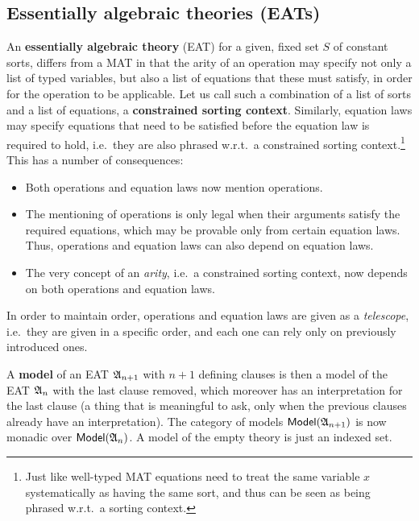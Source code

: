 \documentclass[a4paper]{article}
\begin{document}
\subsection{Essentially algebraic theories (EATs)}
An \textbf{essentially algebraic theory} (EAT) for a given, fixed set $S$ of constant sorts, differs from a MAT in that the arity of an operation may specify not only a list of typed variables, but also a list of equations that these must satisfy, in order for the operation to be applicable.
Let us call such a combination of a list of sorts and a list of equations, a \textbf{constrained sorting context}.
Similarly, equation laws may specify equations that need to be satisfied before the equation law is required to hold, i.e.\ they are also phrased w.r.t.\ a constrained sorting context.\footnote{Just like well-typed MAT equations need to treat the same variable $x$ systematically as having the same sort, and thus can be seen as being phrased w.r.t.\ a sorting context.}
This has a number of consequences:
\begin{itemize}
	\item Both operations and equation laws now mention operations.
	\item The mentioning of operations is only legal when their arguments satisfy the required equations, which may be provable only from certain equation laws. Thus, operations and equation laws can also depend on equation laws.
	\item The very concept of an \emph{arity}, i.e.\ a constrained sorting context, now depends on both operations and equation laws.
\end{itemize}
In order to maintain order, operations and equation laws are given as a \emph{telescope}, i.e.\ they are given in a specific order, and each one can rely only on previously introduced ones.

A \textbf{model} of an EAT ${{\mathfrak{A}}}_{n+1}$ with $n+1$ defining clauses is then a model of the EAT ${{\mathfrak{A}}}_n$ with the last clause removed, which moreover has an interpretation for the last clause (a thing that is meaningful to ask, only when the previous clauses already have an interpretation).
The category of models ${\mathsf{Model}}({{\mathfrak{A}}}_{n+1})$ is now monadic over ${\mathsf{Model}}({{\mathfrak{A}}}_n)$.
A model of the empty theory is just an indexed set.
\end{document}
